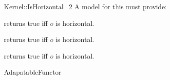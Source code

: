 \begin{ccRefFunctionObjectConcept}{Kernel::IsHorizontal_2}
A model for this must provide:


{returns true iff $o$ is horizontal.}

{returns true iff $o$ is horizontal.}

{returns true iff $o$ is horizontal.}

\ccRefines
AdapatableFunctor

\ccSeeAlso
{} \\
 \\
 \\

\end{ccRefFunctionObjectConcept}

